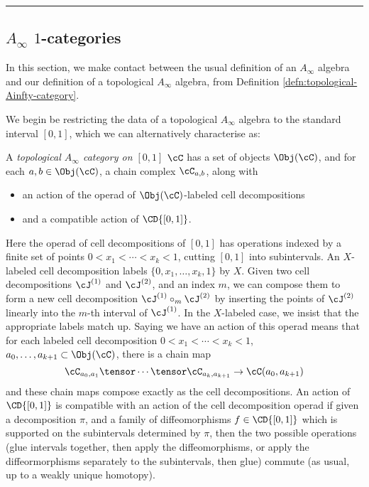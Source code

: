 

\medskip
\hrule
\medskip

\medskip

\subsection{$A_\infty$ $1$-categories}
\label{sec:comparing-A-infty}
In this section, we make contact between the usual definition of an $A_\infty$ algebra and our definition of a topological $A_\infty$ algebra, from Definition \ref{defn:topological-Ainfty-category}.

We begin be restricting the data of a topological $A_\infty$ algebra to the standard interval $[0,1]$, which we can alternatively characterise as:
\begin{defn}
A \emph{topological $A_\infty$ category on $[0,1]$} $\cC$ has a set of objects $\Obj(\cC)$, and for each $a,b \in \Obj(\cC)$, a chain complex $\cC_{a,b}$, along with
\begin{itemize}
\item an action of the operad of $\Obj(\cC)$-labeled cell decompositions
\item and a compatible action of $\CD{[0,1]}$.
\end{itemize}
\end{defn}
Here the operad of cell decompositions of $[0,1]$ has operations indexed by a finite set of points $0 < x_1< \cdots < x_k < 1$, cutting $[0,1]$ into subintervals. An $X$-labeled cell decomposition labels $\{0, x_1, \ldots, x_k, 1\}$ by $X$. Given two cell decompositions $\cJ^{(1)}$ and $\cJ^{(2)}$, and an index $m$, we can compose them to form a new cell decomposition $\cJ^{(1)} \circ_m \cJ^{(2)}$ by inserting the points of $\cJ^{(2)}$ linearly into the $m$-th interval of $\cJ^{(1)}$. In the $X$-labeled case, we insist that the appropriate labels match up. Saying we have an action of this operad means that for each labeled cell decomposition $0 < x_1< \cdots < x_k < 1$, $a_0, \ldots, a_{k+1} \subset \Obj(\cC)$, there is a chain map $$\cC_{a_0,a_1} \tensor \cdots \tensor \cC_{a_k,a_{k+1}} \to \cC(a_0,a_{k+1})$$ and these chain maps compose exactly as the cell decompositions.
An action of $\CD{[0,1]}$ is compatible with an action of the cell decomposition operad if given a decomposition $\pi$, and a family of diffeomorphisms $f \in \CD{[0,1]}$ which is supported on the subintervals determined by $\pi$, then the two possible operations (glue intervals together, then apply the diffeomorphisms, or apply the diffeormorphisms separately to the subintervals, then glue) commute (as usual, up to a weakly unique homotopy).

